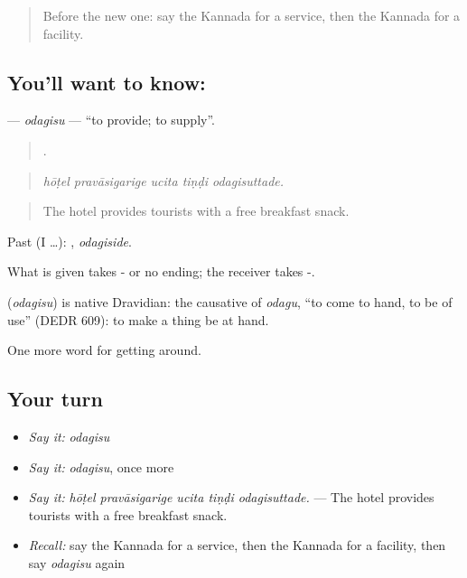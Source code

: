 \label{lesson:KA-C463-odagisu}



\begin{quote}
Before the new one: say the Kannada for a service, then the Kannada for a facility.
\end{quote}

\subsection*{You'll want to know: }
\textbf{} — \emph{odagisu} — \textquotedblleft{}to provide; to supply\textquotedblright{}.

\begin{quote}
    .
\end{quote}

\begin{quote}
\emph{hōṭel pravāsigarige ucita tiṇḍi odagisuttade.}
\end{quote}

\begin{quote}
The hotel provides tourists with a free breakfast snack.
\end{quote}

Past (I …): , \emph{odagiside}.

What is given takes - or no ending; the receiver takes -.

\begin{cousinweb}
\textbf{} (\emph{odagisu}) is native Dravidian: the causative of \emph{odagu}, \textquotedblleft{}to come to hand, to be of use\textquotedblright{} (DEDR 609): to make a thing be at hand.
\end{cousinweb}

\begin{grammarlens}[title={What you've built}]
One more word for getting around.
\end{grammarlens}

\subsection*{Your turn}
\begin{itemize}
\raggedright
  \item \emph{Say it:} \emph{odagisu}
  \item \emph{Say it:} \emph{odagisu}, once more
  \item \emph{Say it:} \emph{hōṭel pravāsigarige ucita tiṇḍi odagisuttade.} — The hotel provides tourists with a free breakfast snack.
  \item \emph{Recall:} say the Kannada for a service, then the Kannada for a facility, then say \emph{odagisu} again
\end{itemize}

